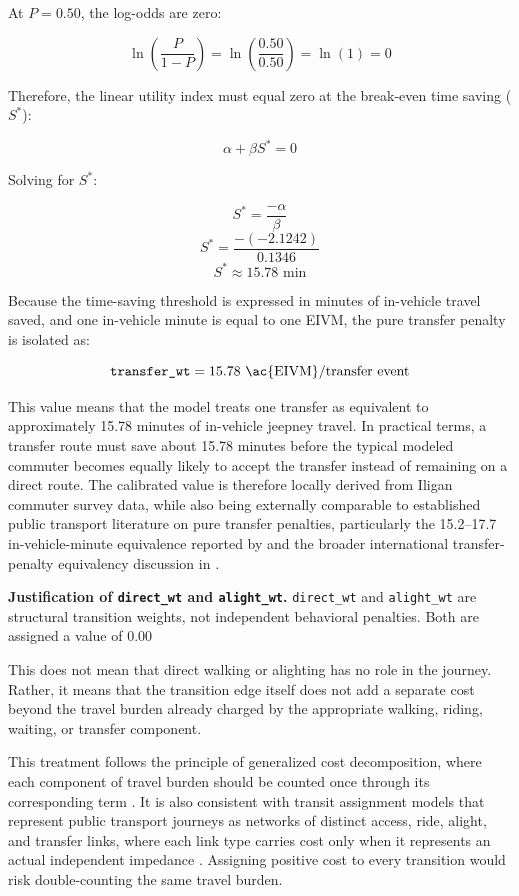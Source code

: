 {At $P=0.50$, the log-odds are zero:

\[
\ln\left(\frac{P}{1-P}\right)=\ln\left(\frac{0.50}{0.50}\right)=\ln(1)=0
\]

Therefore, the linear utility index must equal zero at the break-even time saving ($S^*$):

\[
\alpha+\beta S^*=0
\]

Solving for $S^*$:

\[
S^*=\frac{-\alpha}{\beta}
\]
\[
S^*=\frac{-(-2.1242)}{0.1346}
\]
\[
S^* \approx 15.78 \text{ min}
\]

Because the time-saving threshold is expressed in minutes of in-vehicle travel saved, and one in-vehicle minute is equal to one \ac{EIVM}, the pure transfer penalty is isolated as:

\[
\texttt{transfer\_wt}=15.78 \text{ \ac{EIVM}/transfer event}
\]

This value means that the model treats one transfer as equivalent to approximately 15.78 minutes of in-vehicle jeepney travel. In practical terms, a transfer route must save about 15.78 minutes before the typical modeled commuter becomes equally likely to accept the transfer instead of remaining on a direct route. The calibrated value is therefore locally derived from Iligan commuter survey data, while also being externally comparable to established public transport literature on pure transfer penalties, particularly the 15.2--17.7 in-vehicle-minute equivalence reported by \citep{garciamartinez2018transfer} and the broader international transfer-penalty equivalency discussion in \citep{jara-diaz2022}.

\noindent\textbf{Justification of \texttt{direct\_wt} and \texttt{alight\_wt}.}
\texttt{direct\_wt} and \texttt{alight\_wt} are structural transition weights, not independent behavioral penalties. Both are assigned a value of 0.00 

This does not mean that direct walking or alighting has no role in the journey. Rather, it means that the transition edge itself does not add a separate cost beyond the travel burden already charged by the appropriate walking, riding, waiting, or transfer component.

This treatment follows the principle of generalized cost decomposition, where each component of travel burden should be counted once through its corresponding term \citep{ortuzar2011modelling}. It is also consistent with transit assignment models that represent public transport journeys as networks of distinct access, ride, alight, and transfer links, where each link type carries cost only when it represents an actual independent impedance \citep{spiess1989optimal}. Assigning positive cost to every transition would risk double-counting the same travel burden.

}
